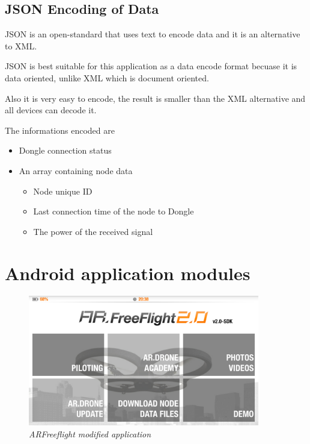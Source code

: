 \subsection{JSON Encoding of Data} \cite{json}

JSON is an open-standard that uses text to encode data and it is an alternative to XML.

JSON is best suitable for this application as a data encode format becuase it is data oriented, unlike XML which is document oriented. 

Also it is very easy to encode, the result is smaller than the XML alternative and all devices can decode it. 

The informations encoded are
\begin{itemize}

\item Dongle connection status
\item An array containing node data
\begin{itemize}

	\item Node unique ID
	\item Last connection time of the node to Dongle
	\item The power of the received signal

	\end{itemize}
\end{itemize}
 


\section{Android application modules}

\begin{figure}[ht]
\begin{center}
\includegraphics[width=0.9\textwidth]{implementation/android_app.png}
\end{center}
\caption{\small \itshape{ARFreeflight modified application}}
\end{figure}

